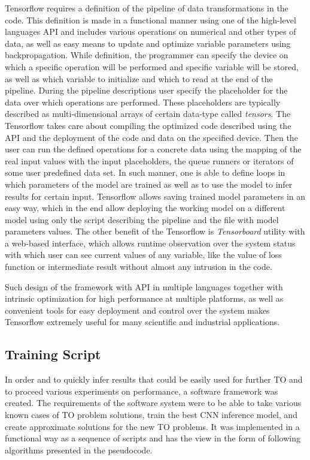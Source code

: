 Tensorflow requires a definition of the pipeline of data transformations in the code.
This definition is made in a functional manner using one of the high-level languages API and includes various operations on numerical and other types of data, as well as easy means to update and optimize variable parameters using backpropagation. 
While definition, the programmer can specify the device on which a specific operation will be performed and specific variable will be stored, as well as which variable to initialize and which to read at the end of the pipeline. 
During the pipeline descriptions user specify the placeholder for the data over which operations are performed. 
These placeholders are typically described as multi-dimensional arrays of certain data-type called \emph{tensors}.
The Tensorflow takes care about compiling the optimized code described using the API and the deployment of the code and data on the specified device. 
Then the user can run the defined operations for a concrete data using the mapping of the real input values with the input placeholders, the queue runners or iterators of some user predefined data set.
In such manner, one is able to define loops in which parameters of the model are trained as well as to use the model to infer results for certain input.
Tensorflow allows saving trained model parameters in an easy way, which in the end allow deploying the working model on a different model using only the script describing the pipeline and the file with model parameters values.
The other benefit of the Tensorflow is \emph{Tensorboard} utility with a web-based interface, which allows runtime observation over the system status with which user can see current values of any variable, like the value of loss function or intermediate result without almost any intrusion in the code.
\medskip

Such design of the framework with API in multiple languages together with intrinsic optimization for high performance at multiple platforms, as well as convenient tools for easy deployment and control over the system makes Tensorflow extremely useful for many scientific and industrial applications.

\subsection{Training Script}

In order and to quickly infer results that could be easily used for further TO and to proceed various experiments on performance, a software framework was created. 
The requirements of the software system were to be able to take various known cases of TO problem solutions, train the best CNN inference model, and create approximate solutions for the new TO problems.
It was implemented in a functional way as a sequence of scripts and has the view in the form of following algorithms presented in the pseudocode. 
\medskip

